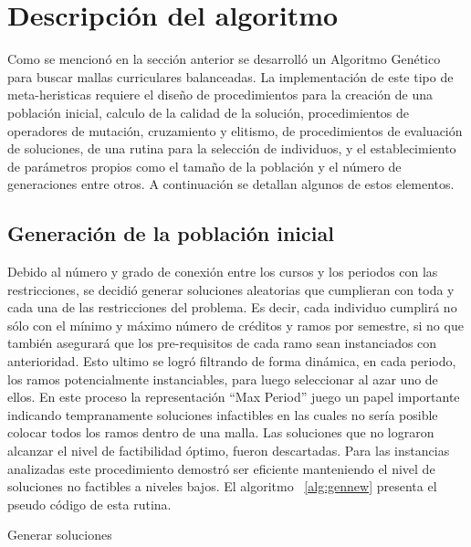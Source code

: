 \documentclass[letter, 10pt]{article}
\begin{document}
\section{Descripción del algoritmo}
Como se mencionó en la sección anterior se desarrolló un Algoritmo Genético para
buscar mallas curriculares balanceadas.  La implementación de este tipo de
meta-heristicas requiere el diseño de procedimientos para la creación de una
población inicial, calculo de la calidad de la solución, procedimientos de
operadores de mutación, cruzamiento y elitismo, de procedimientos de evaluación
de soluciones, de una rutina para la selección de individuos, y el
establecimiento de parámetros propios como el tamaño de la población y el número
de generaciones entre otros.  A continuación se detallan algunos de estos
elementos.

\subsection{Generación de la población inicial}
Debido al número y grado de conexión entre los cursos y los periodos con las
restricciones, se decidió generar soluciones aleatorias que cumplieran con toda
y cada una de las restricciones del problema. Es decir, cada individuo cumplirá
no sólo con el mínimo y máximo número de créditos y ramos por semestre, si no
que también asegurará que los pre-requisitos de cada ramo sean instanciados con
anterioridad. Esto ultimo se logró filtrando de forma dinámica, en cada periodo,
los ramos potencialmente instanciables, para luego seleccionar al azar uno de
ellos. En este proceso la representación ``Max Period'' juego un papel importante
indicando tempranamente soluciones infactibles en las cuales no sería posible
colocar todos los ramos dentro de una malla. Las soluciones que no lograron
alcanzar el nivel de factibilidad óptimo, fueron descartadas. Para las
instancias analizadas este procedimiento demostró ser eficiente manteniendo el
nivel de soluciones no factibles a niveles bajos. El algoritmo ~\ref{alg:gennew}
presenta el pseudo código de esta rutina.

\begin{algorithm}[H]
\SetLine
{}
\caption{Generar soluciones}
\label{alg:gennew}
\end{algorithm}
\end{document}
